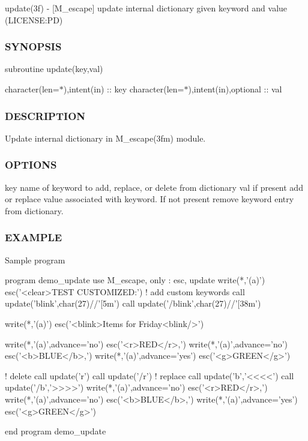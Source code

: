 update(3f) -\/ \mbox{[}M\+\_\+escape\mbox{]} update internal dictionary given keyword and value (L\+I\+C\+E\+N\+SE\+:PD) \subsubsection*{S\+Y\+N\+O\+P\+S\+IS}

subroutine update(key,val)

character(len=$\ast$),intent(in) \+:\+: key character(len=$\ast$),intent(in),optional \+:\+: val \subsubsection*{D\+E\+S\+C\+R\+I\+P\+T\+I\+ON}

Update internal dictionary in M\+\_\+escape(3fm) module. \subsubsection*{O\+P\+T\+I\+O\+NS}

key name of keyword to add, replace, or delete from dictionary val if present add or replace value associated with keyword. If not present remove keyword entry from dictionary. \subsubsection*{E\+X\+A\+M\+P\+LE}

Sample program \begin{DoxyVerb}    program demo_update
    use M_escape, only : esc, update
       write(*,'(a)') esc('<clear>TEST CUSTOMIZED:')
       ! add custom keywords
       call update('blink',char(27)//'[5m')
       call update('/blink',char(27)//'[38m')

       write(*,'(a)') esc('<blink>Items for Friday<blink/>')

       write(*,'(a)',advance='no') esc('<r>RED</r>,')
       write(*,'(a)',advance='no') esc('<b>BLUE</b>,')
       write(*,'(a)',advance='yes') esc('<g>GREEN</g>')

       ! delete
       call update('r')
       call update('/r')
       ! replace
       call update('b','<<<<')
       call update('/b','>>>>')
       write(*,'(a)',advance='no') esc('<r>RED</r>,')
       write(*,'(a)',advance='no') esc('<b>BLUE</b>,')
       write(*,'(a)',advance='yes') esc('<g>GREEN</g>')

 end program demo_update
\end{DoxyVerb}


